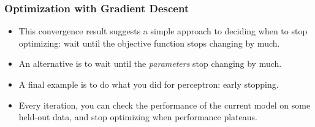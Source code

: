 \documentclass[trans]{beamer}
\begin{document}




\begin{comment}
Fortunately, we can prove a simpler version of this theorem for
one-dimensional functions.  We do this just to give a sense of how
convergence proofs go.  In the single dimensional case, we will call
the algorithm ``derivative descent.''  To set up some notation, let
$f(z)$ be the function to be minimized by derivative descent.  Let
$z_0$ be the initial value and $z^*$ be the optimum.  Let $f'(z)$ be
the first derivative of $f$ and let $f''$ be the second derivative.
Let $L$ be large enough that $f''(z) < L$ for all $z$.

\begin{theorem}[Derivative Descent Convergence] \label{thm:loss:dd}
  For constant $\eta = 1/L$, derivative descent will converge at a
  rate of $f(z\kth) - f(z^*) \leq \frac {2 (z\zth-z^*)^2} {\eta(k+1)}$.
\end{theorem}

\begin{myproof}{\ref{thm:loss:dd}}
  We use Taylor's theorem to expand $f(z)$:
  \begin{align}
    f(z)
      &= f(a)
       + f'(a) (z-a)
       + \frac 1 2 f''(a) (z-a)^2
       + \dots \\
      &\leq f(a)
       + f'(a) (z-a)
       + \frac 1 2 f''(a) (z-a)^2
  \end{align}
  The ``\dots'' is guaranteed to be non-negative because $f$ is
  convex.  
\end{myproof}
\end{comment}
\begin{frame}
  \frametitle{Optimization with Gradient Descent}
\begin{itemize}
\item
This convergence result suggests a simple approach to deciding when to
stop optimizing: wait until the objective function stops changing by
much.  
\item An alternative is to wait until the \emph{parameters} stop
changing by much. 
\item A final example is to do what you did for
perceptron: early stopping.  
\item Every iteration, you can check the
performance of the current model on some held-out data, and stop
optimizing when performance plateaus.
\end{itemize}
\end{frame}
\end{document}
